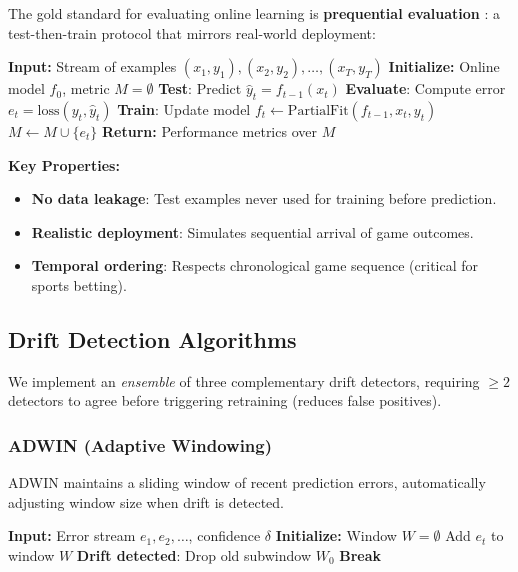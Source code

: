 The gold standard for evaluating online learning is \textbf{prequential evaluation} \citep{dawid1984present}: a test-then-train protocol that mirrors real-world deployment:

\begin{algorithm}[H]
\caption{Prequential Evaluation Protocol}
\label{alg:prequential}
\begin{algorithmic}[1]
\State \textbf{Input:} Stream of examples $(x_1, y_1), (x_2, y_2), \ldots, (x_T, y_T)$
\State \textbf{Initialize:} Online model $f_0$, metric $M = \emptyset$
    \State \textbf{Test}: Predict $\hat{y}_t = f_{t-1}(x_t)$
    \State \textbf{Evaluate}: Compute error $e_t = \text{loss}(y_t, \hat{y}_t)$
    \State \textbf{Train}: Update model $f_t \gets \text{PartialFit}(f_{t-1}, x_t, y_t)$
    \State $M \gets M \cup \{e_t\}$
\EndFor
\State \textbf{Return:} Performance metrics over $M$
\end{algorithmic}
\end{algorithm}

\noindent \textbf{Key Properties:}
\begin{itemize}
    \item \textbf{No data leakage}: Test examples never used for training before prediction.
    \item \textbf{Realistic deployment}: Simulates sequential arrival of game outcomes.
    \item \textbf{Temporal ordering}: Respects chronological game sequence (critical for sports betting).
\end{itemize}

\subsection{Drift Detection Algorithms}

We implement an \textit{ensemble} of three complementary drift detectors, requiring $\geq 2$ detectors to agree before triggering retraining (reduces false positives).

\subsubsection{ADWIN (Adaptive Windowing)}

ADWIN \citep{bifet2007learning} maintains a sliding window of recent prediction errors, automatically adjusting window size when drift is detected.

\begin{algorithm}[H]
\caption{ADWIN Drift Detection}
\label{alg:adwin}
\begin{algorithmic}[1]
\State \textbf{Input:} Error stream $e_1, e_2, \ldots$, confidence $\delta$
\State \textbf{Initialize:} Window $W = \emptyset$
    \State Add $e_t$ to window $W$
            \State \textbf{Drift detected}: Drop old subwindow $W_0$
            \State \textbf{Break}
        \EndIf
    \EndFor
\EndFor
\end{algorithmic}
\end{algorithm}


